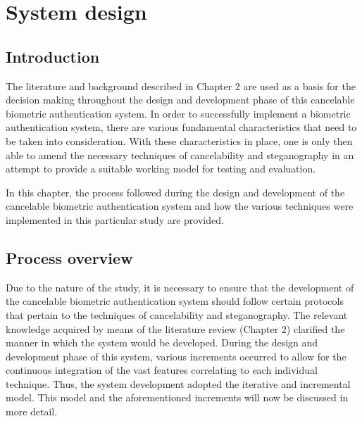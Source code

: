 \chapter{System design}

\ifpdf
    \graphicspath{{Chapter3/Figs/Raster/}{Chapter3/Figs/PDF/}{Chapter3/Figs/}}
\else
    \graphicspath{{Chapter3/Figs/Vector/}{Chapter3/Figs/}}
\fi

\section{Introduction}

The literature and background described in Chapter 2 are used as a basis for the decision making throughout the design and development phase of this cancelable biometric authentication system. 
In order to successfully implement a biometric authentication system, there are various fundamental characteristics that need to be taken into consideration. With these characteristics in place, one is only then able to amend the necessary techniques of cancelability and steganography in an attempt to provide a suitable working model for testing and evaluation. 

In this chapter, the process followed during the design and development of the cancelable biometric authentication system and how the various techniques were implemented in this particular study are provided.


\section{Process overview}

Due to the nature of the study, it is necessary to ensure that the development of the cancelable biometric authentication system should follow certain protocols that pertain to the techniques of cancelability and steganography. The relevant knowledge acquired by means of the literature review (Chapter 2) clarified the manner in which the system would be developed. During the design and development phase of this system, various increments occurred to allow for the continuous integration of the vast features correlating to each individual technique. Thus, the system development adopted the iterative and incremental model. This model and the aforementioned increments will now be discussed in more detail.

